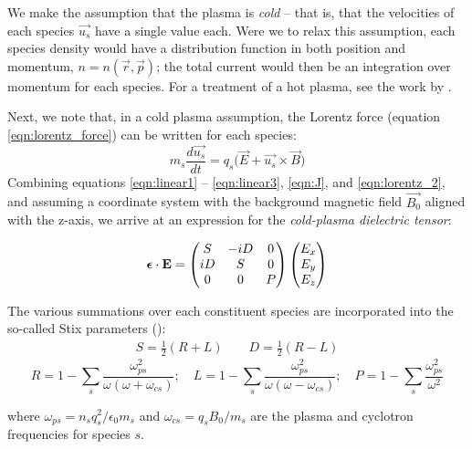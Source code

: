We make the assumption that the plasma is \emph{cold} -- that is, that the velocities of each species $\vec{u_s}$ have a single value each. Were we to relax this assumption, each species density would have a distribution function in both position and momentum, $n=n(\vec{r},\vec{p})$; the total current would then be an integration over momentum for each species. For a treatment of a hot plasma, see the work by \cite{Sazhin1993}.

Next, we note that, in a cold plasma assumption, the Lorentz force (equation \ref{eqn:lorentz_force}) can be written for each species:
\begin{equation}
m_s\frac{d\vec{u_s}}{dt} = q_s\big(\vec{E} + \vec{u_s}\times\vec{B}\big) 
\label{eqn:lorentz_2}
\end{equation}
Combining equations \ref{eqn:linear1} -- \ref{eqn:linear3}, \ref{eqn:J}, and \ref{eqn:lorentz_2}, and assuming a coordinate system with the background magnetic field $\vec{B_0}$ aligned with the z-axis, we arrive at an expression for the \emph{cold-plasma dielectric tensor}:

\begin{equation}
\boldsymbol{\epsilon}\cdot\mathbf{E}=\begin{pmatrix}
S & -iD & 0 \\
iD & S & 0 \\
0 & 0 & P \end{pmatrix}\begin{pmatrix}E_x \\ E_y \\ E_z\end{pmatrix}
\end{equation}

The various summations over each constituent species are incorporated into the so-called Stix parameters (\cite{Stix1992}):
\begin{eqnarray}
S =\frac{1}{2}(R + L) \qquad D = \frac{1}{2}(R - L)
\label{eqn:stix_params_1}
\end{eqnarray}
\begin{equation}
R = 1 - \sum_s\frac{\omega_{ps}^2}{\omega(\omega + \omega_{cs})}; \quad L = 1 - \sum_s\frac{\omega_{ps}^2}{\omega(\omega - \omega_{cs})}; \quad P = 1 - \sum_s\frac{\omega_{ps}^2}{\omega^2}
\label{eqn:stix_params_2}
\end{equation}

where $\omega_{ps} = n_sq_s^2/{\epsilon_0 m_s}$ and $\omega_{cs}=q_sB_0/m_s$ are the plasma and cyclotron frequencies for species $s$.

